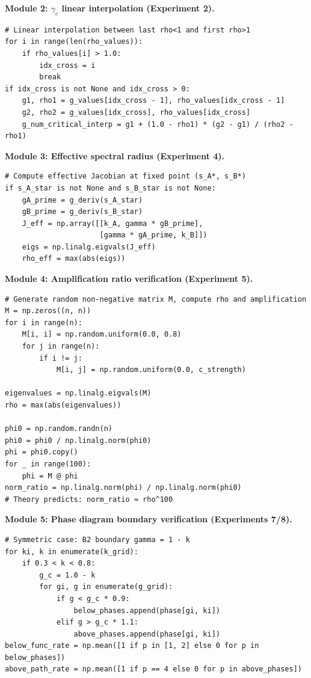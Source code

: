 \documentclass[12pt,a4paper]{article}
\theoremstyle{definition}
\newcommand{\gamc}{\gamma_c}
\begin{document}
\textbf{Module 2: $\gamc$ linear interpolation (Experiment 2).}
\begin{lstlisting}[caption={$\gamc$ linear interpolation}, label={lst:interp-en}]
# Linear interpolation between last rho<1 and first rho>1
for i in range(len(rho_values)):
    if rho_values[i] > 1.0:
        idx_cross = i
        break
if idx_cross is not None and idx_cross > 0:
    g1, rho1 = g_values[idx_cross - 1], rho_values[idx_cross - 1]
    g2, rho2 = g_values[idx_cross], rho_values[idx_cross]
    g_num_critical_interp = g1 + (1.0 - rho1) * (g2 - g1) / (rho2 - rho1)
\end{lstlisting}

\textbf{Module 3: Effective spectral radius (Experiment 4).}
\begin{lstlisting}[caption={Effective spectral radius for nonlinear coupling}, label={lst:rho-eff-en}]
# Compute effective Jacobian at fixed point (s_A*, s_B*)
if s_A_star is not None and s_B_star is not None:
    gA_prime = g_deriv(s_A_star)
    gB_prime = g_deriv(s_B_star)
    J_eff = np.array([[k_A, gamma * gB_prime],
                      [gamma * gA_prime, k_B]])
    eigs = np.linalg.eigvals(J_eff)
    rho_eff = max(abs(eigs))
\end{lstlisting}

\textbf{Module 4: Amplification ratio verification (Experiment 5).}
\begin{lstlisting}[caption={Theorem 4 amplification ratio verification}, label={lst:t4-en}]
# Generate random non-negative matrix M, compute rho and amplification
M = np.zeros((n, n))
for i in range(n):
    M[i, i] = np.random.uniform(0.0, 0.8)
    for j in range(n):
        if i != j:
            M[i, j] = np.random.uniform(0.0, c_strength)

eigenvalues = np.linalg.eigvals(M)
rho = max(abs(eigenvalues))

phi0 = np.random.randn(n)
phi0 = phi0 / np.linalg.norm(phi0)
phi = phi0.copy()
for _ in range(100):
    phi = M @ phi
norm_ratio = np.linalg.norm(phi) / np.linalg.norm(phi0)
# Theory predicts: norm_ratio ≈ rho^100
\end{lstlisting}

\textbf{Module 5: Phase diagram boundary verification (Experiments 7/8).}
\begin{lstlisting}[caption={Phase diagram boundary verification}, label={lst:phase-en}]
# Symmetric case: B2 boundary gamma = 1 - k
for ki, k in enumerate(k_grid):
    if 0.3 < k < 0.8:
        g_c = 1.0 - k
        for gi, g in enumerate(g_grid):
            if g < g_c * 0.9:
                below_phases.append(phase[gi, ki])
            elif g > g_c * 1.1:
                above_phases.append(phase[gi, ki])
below_func_rate = np.mean([1 if p in [1, 2] else 0 for p in below_phases])
above_path_rate = np.mean([1 if p == 4 else 0 for p in above_phases])
\end{lstlisting}
\end{document}
